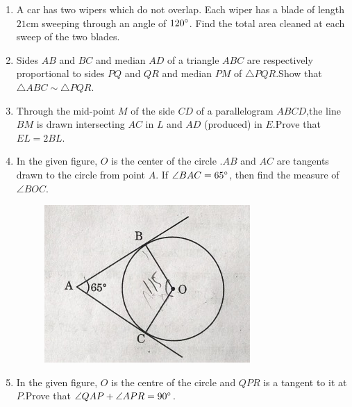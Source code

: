 
\begin{enumerate}

\item A car has two wipers which do not overlap. Each wiper has a blade of length $21 \mathrm{cm}$ sweeping through an angle of $120\degree$. Find the total area cleaned at each sweep of the two blades.

\item Sides $AB$ and $BC$ and median $AD$ of a triangle $ABC$ are respectively proportional to sides $PQ$ and $QR$ and median $PM$ of $\triangle PQR$.Show that $\triangle ABC \sim \triangle PQR$.

\item Through the mid-point $M$ of the side $CD$ of a parallelogram $ABCD$,the line $BM$ is drawn intersecting $AC$ in $L$ and $AD$ (produced) in $E$.Prove that $EL = 2BL$. 

\item In the given figure, $O$ is the center of the circle .$AB$ and $AC$ are tangents drawn to the circle from point $A$. If $\angle BAC = 65\degree $, then find the measure of $\angle BOC $.
	\begin{figure}[!ht]
		\centering
		\includegraphics[width=\columnwidth]{figs/last5.jpg}
		\caption{}
		\label{fig:enter-label}
	\end{figure}

\newpage
\item In the given figure, $O$ is the centre of the circle and $QPR$ is a tangent to it at $P$.Prove that $\angle QAP + \angle APR = 90\degree$.


\end{enumerate}

